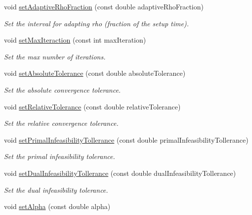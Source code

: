 \begin{DoxyCompactItemize}
void \hyperlink{classOSQPWrapper_1_1OptimizerSettings_a3efdf76b1fea422452156d9a44db7479}{set\+Adaptive\+Rho\+Fraction} (const double adaptive\+Rho\+Fraction)
\begin{DoxyCompactList}\small\item\em Set the interval for adapting rho (fraction of the setup time). \end{DoxyCompactList}\item 
void \hyperlink{classOSQPWrapper_1_1OptimizerSettings_a0cc53fc78b45b6608f88e277c6564b65}{set\+Max\+Iteraction} (const int max\+Iteration)
\begin{DoxyCompactList}\small\item\em Set the max number of iterations. \end{DoxyCompactList}\item 
void \hyperlink{classOSQPWrapper_1_1OptimizerSettings_a086a20d40655abefacd9ec4e8ca9f8cd}{set\+Absolute\+Tolerance} (const double absolute\+Tolerance)
\begin{DoxyCompactList}\small\item\em Set the absolute convergence tolerance. \end{DoxyCompactList}\item 
void \hyperlink{classOSQPWrapper_1_1OptimizerSettings_a285d31d375d498ab27e6888997e42b88}{set\+Relative\+Tolerance} (const double relative\+Tolerance)
\begin{DoxyCompactList}\small\item\em Set the relative convergence tolerance. \end{DoxyCompactList}\item 
void \hyperlink{classOSQPWrapper_1_1OptimizerSettings_a687099f54953ad7e52e56e5958cc437d}{set\+Primal\+Infeasibility\+Tollerance} (const double primal\+Infeasibility\+Tollerance)
\begin{DoxyCompactList}\small\item\em Set the primal infeasibility tolerance. \end{DoxyCompactList}\item 
void \hyperlink{classOSQPWrapper_1_1OptimizerSettings_a943057aa80b523623ae6a38c50bbe7e5}{set\+Dual\+Infeasibility\+Tollerance} (const double dual\+Infeasibility\+Tollerance)
\begin{DoxyCompactList}\small\item\em Set the dual infeasibility tolerance. \end{DoxyCompactList}\item 
void \hyperlink{classOSQPWrapper_1_1OptimizerSettings_a47cb482b8cdf4434d36f3958da65d70b}{set\+Alpha} (const double alpha)

\end{DoxyCompactItemize}
